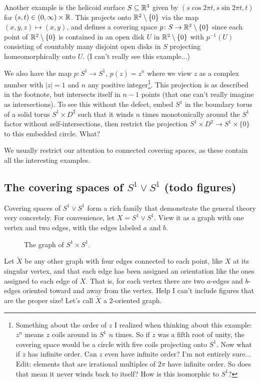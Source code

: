 \begin{example}
    Another example is the helicoid surface $S\subseteq \mathbb{R}^3$ given by $(s \cos 2\pi t, s \sin 2\pi t, t)$ for $(s,t)\in (0,\infty)\times \mathbb{R}$. This projects onto $\mathbb{R}^2\setminus \{0\} $ via the map $(x,y,z) \mapsto (x,y)$, and defines a covering space $p \colon S \to \mathbb{R}^2\setminus \{0\} $ since each point of $\mathbb{R}^2\setminus \{0\} $ is contained in an open disk $U$ in $\mathbb{R}^2\setminus \{0\} $ with $p ^{-1}(U)$ consisting of countably many disjoint open disks in $S$ projecting homeomorphically onto $U$. (I can't really see this example...)
\end{example}
\begin{example}
    We also have the map $p \colon S^{1}  \to S^{1} $, $p(z)=z^n$ where we view $z$ as a complex number with $|z|=1$ and $n$ any positive integer\footnote{Something about the order of $z$ I realized when thinking about this example: $z^n$ means $z$ coils around in $S^{1} $ $n$ times. So if $z$ was a fifth root of unity, the covering space would be a circle with five coils projecting onto $S^{1} $. Now what if $z$ has infinite order. Can $z$ even have infinite order? I'm not entirely sure...\\Edit: elements that are irrational multiples of $2\pi$ have infinite order. So does that mean it never winds back to itself? How is this isomorphic to $S^{1} $?}. This projection is as described in the footnote, but intersects itself in $n-1$ points (that one can't really imagine as intersections). To see this without the defect, embed $S^{1} $ in the boundary torus of a solid torus $S^{1} \times D^2$ such that it winds $n$ times monotonically around the $S^{1}$ factor without self-intersections, then restrict the projection $S^{1} \times D^2 \to S^{1} \times \{0\} $ to this embedded circle. What?
\end{example}

We usually restrict our attention to connected covering spaces, as these contain all the interesting examples.

\subsection{The covering spaces of $S^{1} \vee S^{1} $ (todo figures)}
Covering spaces of $S^{1} \vee S^{1} $ form a rich family that demonstrate the general theory very concretely. For convenience, let $X=S^{1} \vee S^{1} $. View it as a graph with one vertex and two edges, with the edges labeled $a$ and $b$. 
\begin{figure}[H]
    \centering
    \caption{The graph of $S^{1} \times S^{1} $.}
    \label{s1xs1}
\end{figure}
Let $\widetilde X$ be any other graph with four edges connected to each point, like $X$ at its singular vertex, and that each edge has been assigned an orientation like the ones assigned to each edge of $X$. That is, for each vertex there are two $a$-edges and $b$-edges oriented toward and away from the vertex. Help I can't include figures that are the proper size! Let's call $\widetilde X$ a $2$-oriented graph.

